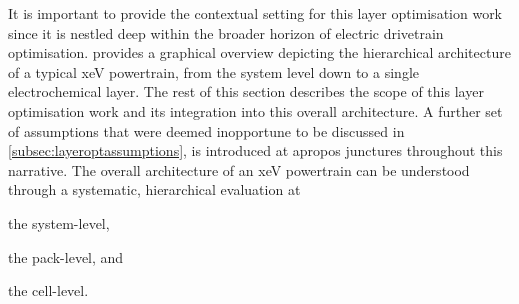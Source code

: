 It is  important to provide the  contextual setting for this  layer optimisation
work since it is nestled deep  within the broader horizon of electric drivetrain
optimisation.   provides a  graphical overview
depicting the hierarchical architecture of  a typical \gls{xeV} powertrain, from
the  system level  down to  a  single electrochemical  layer. The  rest of  this
section describes the scope of this  layer optimisation work and its integration
into this  overall architecture. A further  set of assumptions that  were deemed
inopportune to be discussed  in \cref{subsec:layeroptassumptions}, is introduced
at apropos junctures  throughout this narrative. The overall  architecture of an
\gls{xeV}  powertrain  can  be  understood through  a  systematic,  hierarchical
evaluation at
\begin{enumerate*}[label=\itshape\alph*\upshape)]
    \item the system-level,
    \item the pack-level, and
    \item the cell-level.
\end{enumerate*}

